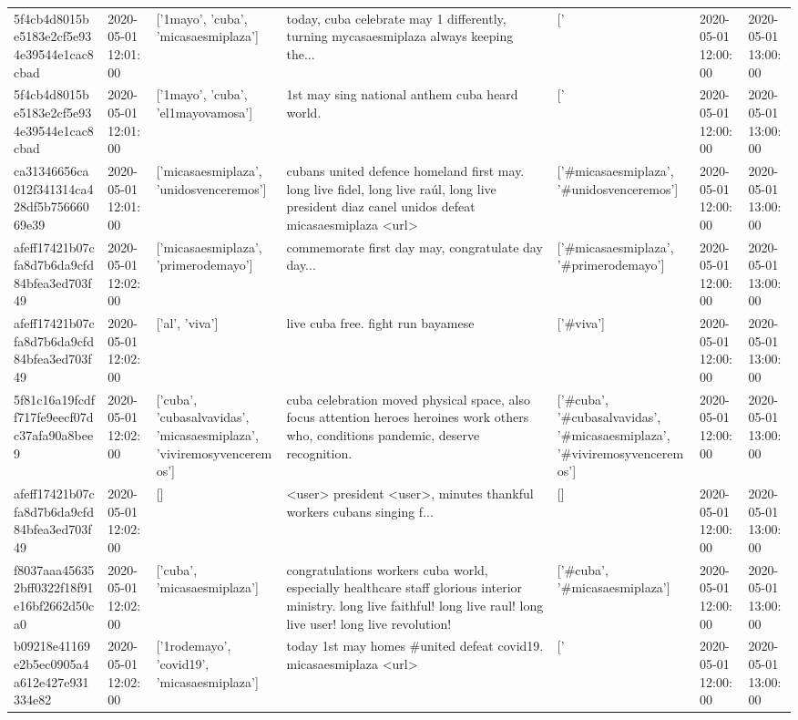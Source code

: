 \begin{tabular}{lllllll}
5f4cb4d8015be5183e2cf5e934e39544e1cac8cbad & 2020-05-01 12:01:00 & ['1mayo', 'cuba', 'micasaesmiplaza'] & today, cuba celebrate may 1 differently, turning mycasaesmiplaza always keeping the... & ['#1mayo', '#cuba', '#micasaesmiplaza'] & 2020-05-01 12:00:00 & 2020-05-01 13:00:00 \\
5f4cb4d8015be5183e2cf5e934e39544e1cac8cbad & 2020-05-01 12:01:00 & ['1mayo', 'cuba', 'el1mayovamosa'] & 1st may sing national anthem cuba heard world. & ['#1mayo', '#cuba', '#el1mayovamosa'] & 2020-05-01 12:00:00 & 2020-05-01 13:00:00 \\
ca31346656ca012f341314ca428df5b75666069e39 & 2020-05-01 12:01:00 & ['micasaesmiplaza', 'unidosvenceremos'] & cubans united defence homeland first may. long live fidel, long live raúl, long live president diaz canel unidos defeat micasaesmiplaza <url> & ['#micasaesmiplaza', '#unidosvenceremos'] & 2020-05-01 12:00:00 & 2020-05-01 13:00:00 \\
afeff17421b07cfa8d7b6da9cfd84bfea3ed703f49 & 2020-05-01 12:02:00 & ['micasaesmiplaza', 'primerodemayo'] & commemorate first day may, congratulate day day... & ['#micasaesmiplaza', '#primerodemayo'] & 2020-05-01 12:00:00 & 2020-05-01 13:00:00 \\
afeff17421b07cfa8d7b6da9cfd84bfea3ed703f49 & 2020-05-01 12:02:00 & ['al', 'viva'] & live cuba free. fight run bayamese 👏 & ['#viva'] & 2020-05-01 12:00:00 & 2020-05-01 13:00:00 \\
5f81c16a19fcdff717fe9eecf07dc37afa90a8bee9 & 2020-05-01 12:02:00 & ['cuba', 'cubasalvavidas', 'micasaesmiplaza', 'viviremosyvenceremos'] & cuba celebration moved physical space, also focus attention heroes heroines work others who, conditions pandemic, deserve recognition. & ['#cuba', '#cubasalvavidas', '#micasaesmiplaza', '#viviremosyvenceremos'] & 2020-05-01 12:00:00 & 2020-05-01 13:00:00 \\
afeff17421b07cfa8d7b6da9cfd84bfea3ed703f49 & 2020-05-01 12:02:00 & [] & <user> president <user>, minutes thankful workers cubans singing f... & [] & 2020-05-01 12:00:00 & 2020-05-01 13:00:00 \\
f8037aaa456352bff0322f18f91e16bf2662d50ca0 & 2020-05-01 12:02:00 & ['cuba', 'micasaesmiplaza'] & congratulations workers cuba world, especially healthcare staff glorious interior ministry. long live faithful! long live raul! long live user! long live revolution! & ['#cuba', '#micasaesmiplaza'] & 2020-05-01 12:00:00 & 2020-05-01 13:00:00 \\
b09218e41169e2b5ec0905a4a612e427e931334e82 & 2020-05-01 12:02:00 & ['1rodemayo', 'covid19', 'micasaesmiplaza'] & today 1st may homes \#united defeat covid19. micasaesmiplaza <url> & ['#1rodemayo', '#covid19', '#micasaesmiplaza'] & 2020-05-01 12:00:00 & 2020-05-01 13:00:00 \\

\end{tabular}
